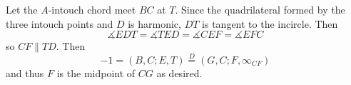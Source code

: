 Let the $A$-intouch chord meet $BC$ at $T$. Since the quadrilateral formed by the three intouch points and $D$ is harmonic, $DT$ is tangent to the incircle. Then \[\measuredangle{EDT}=\measuredangle{TED}=\measuredangle{CEF}=\measuredangle{EFC}\] so $CF\parallel TD$. Then \[-1=(B,C;E,T)\stackrel{D}{=}(G,C;F,\infty_{CF})\] and thus $F$ is the midpoint of $CG$ as desired.